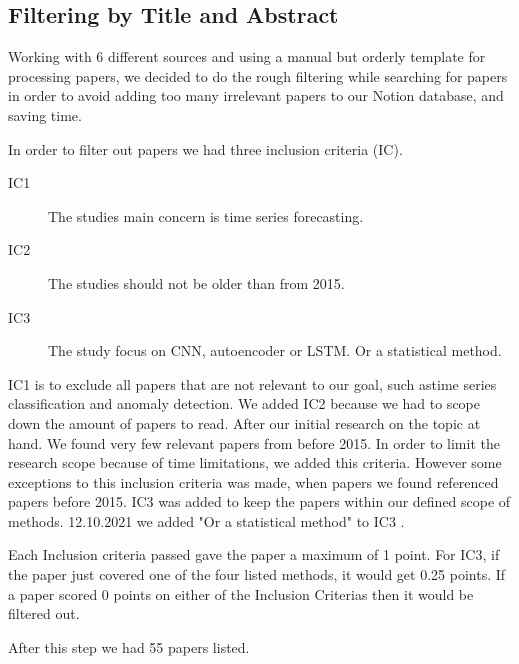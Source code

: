 \subsection{Filtering by Title and Abstract}
Working with 6 different sources and using a manual but orderly template for processing papers,
we decided to do the rough filtering while searching for papers in order to avoid adding too many irrelevant
papers to our Notion database, and saving time.

In order to filter out papers we had three inclusion criteria (IC).
\begin{description}
    \item[IC1] The studies main concern is time series forecasting.
    \item[IC2] The studies should not be older than from 2015.
    \item[IC3] The study focus on CNN, autoencoder or LSTM. Or a statistical method.
\end{description}
IC1 is to exclude all papers that are not relevant to our goal, such astime series classification and anomaly detection.
We added IC2 because we had to scope down the amount of papers to read.
After our initial research on the topic at hand. We found very few relevant papers from before 2015.
In order to limit the research scope because of time limitations, we added this criteria.
However some exceptions to this inclusion criteria was made,
when papers we found referenced papers before 2015.
IC3 was added to keep the papers within our defined scope of methods. 12.10.2021 we added "Or a statistical method"
to IC3 \citep{decisionmatrix}.

Each Inclusion criteria passed gave the paper a maximum of 1 point. For IC3, if the paper just covered one of the 
four listed methods, it would get 0.25 points. If a paper scored 0 points on either of the Inclusion Criterias then
it would be filtered out.

After this step we had 55 papers listed.

